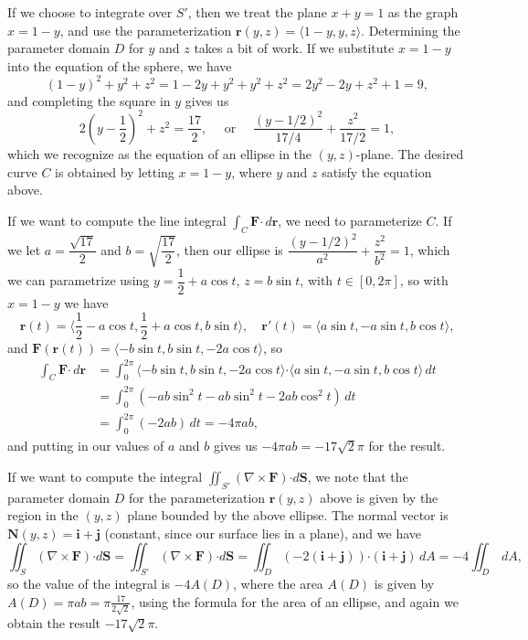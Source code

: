 \documentclass[letterpaper,12pt]{article}
\newcommand{\F}{\mathbf{F}}
\newcommand{\dotp}{\boldsymbol{\cdot}}
\renewcommand{\r}{\mathbf{r}}
\renewcommand{\i}{\mathbf{i}}
\renewcommand{\j}{\mathbf{j}}
\renewcommand{\S}{\mathbf{S}}
\newcommand{\N}{\mathbf{N}}
\begin{document}
\begin{enumerate}
If we choose to integrate over $S'$, then we treat the plane $x+y=1$ as the graph $x=1-y$, and use the parameterization $\r(y,z) = \langle 1-y,y,z\rangle$. Determining the parameter domain $D$ for $y$ and $z$ takes a bit of work. If we substitute $x=1-y$ into the equation of the sphere, we have
\[
 (1-y)^2+y^2+z^2 = 1-2y+y^2+y^2+z^2 = 2y^2-2y+z^2+1=9,
\]
and completing the square in $y$ gives us
\[
 2(y-\frac{1}{2})^2+z^2 = \frac{17}{2}, \quad \text{ or } \quad \frac{(y-1/2)^2}{17/4}+\frac{z^2}{17/2}=1,
\]
which we recognize as the equation of an ellipse in the $(y,z)$-plane. The desired curve $C$ is obtained by letting $x=1-y$, where $y$ and $z$ satisfy the equation above.

\medskip

If we want to compute the line integral $\int_C\F\dotp\,d\r$, we need to parameterize $C$. If we let $a = \dfrac{\sqrt{17}}{2}$ and $b = \sqrt{\dfrac{17}{2}}$, then our ellipse is $\dfrac{(y-1/2)^2}{a^2}+\dfrac{z^2}{b^2}=1$, which we can parametrize using $y = \dfrac{1}{2}+a\cos t$, $z=b\sin t$, with $t\in [0,2\pi]$, so with $x=1-y$ we have
\[
 \r(t) = \langle \frac{1}{2}-a\cos t, \frac{1}{2}+a\cos t, b\sin t\rangle, \quad \r'(t) = \langle a\sin t, -a\sin t, b\cos t\rangle,
\]
and $\F(\r(t)) = \langle -b\sin t, b\sin t, -2a\cos t\rangle$, so
\begin{align*}
 \int_C\F\dotp\,d\r &= \int_0^{2\pi}\langle -b\sin t, b\sin t, -2a\cos t\rangle\dotp \langle a\sin t, -a\sin t, b\cos t\rangle\,dt\\
& = \int_0^{2\pi} (-ab\sin^2t-ab\sin^2t-2ab\cos^2t)\,dt\\
& = \int_0^{2\pi} (-2ab)\,dt = -4\pi ab,
\end{align*}
and putting in our values of $a$ and $b$ gives us $-4\pi ab = -17\sqrt{2}\pi$ for the result.

\medskip

If we want to compute the integral $\iint_{S'}(\nabla\times \F)\dotp d\S$, we note that the parameter domain $D$ for the parameterization $\r(y,z)$ above is given by the region in the $(y,z)$ plane bounded by the above ellipse. The normal vector is $\N(y,z) = \i+\j$ (constant, since our surface lies in a plane), and we have
\[
 \iint_{S}(\nabla\times \F)\dotp d\S = \iint_{S'}(\nabla\times \F)\dotp d\S = \iint_D (-2(\i+\j))\dotp (\i+\j)\,dA = -4\iint_D\,dA,
\]
so the value of the integral is $-4A(D)$, where the area $A(D)$ is given by $A(D) = \pi ab = \pi\frac{17}{2\sqrt{2}}$, using the formula for the area of an ellipse, and again we obtain the result $-17\sqrt{2}\pi$.
\end{enumerate}
\end{document}
